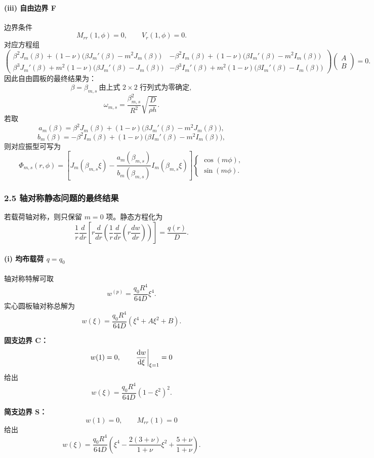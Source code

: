 \documentclass[12pt]{ctexart}
\begin{document}
\paragraph{(iii) 自由边界 F}
边界条件
\[
M_{rr}(1,\phi)=0,\qquad V_r(1,\phi)=0.
\]
对应方程组
\[
\begin{pmatrix}
\beta^2 J_m(\beta)+(1-\nu)\bigl(\beta J_m'(\beta)-m^2J_m(\beta)\bigr)
&
-\beta^2 I_m(\beta)+(1-\nu)\bigl(\beta I_m'(\beta)-m^2I_m(\beta)\bigr)
\\[6pt]
\beta^3 J_m'(\beta)+m^2(1-\nu)\bigl(\beta J_m'(\beta)-J_m(\beta)\bigr)
&
-\beta^3 I_m'(\beta)+m^2(1-\nu)\bigl(\beta I_m'(\beta)-I_m(\beta)\bigr)
\end{pmatrix}
\begin{pmatrix} A\\ B \end{pmatrix}=0.
\]
因此自由圆板的最终结果为：
\[
\beta=\beta_{m,s}\ \text{由上式 }2\times2\text{ 行列式为零确定},
\]
\[
\omega_{m,s}
=
\frac{\beta_{m,s}^2}{R^2}\sqrt{\frac{D}{\rho h}}.
\]
若取
\[
a_m(\beta)
=
\beta^2 J_m(\beta)+(1-\nu)\bigl(\beta J_m'(\beta)-m^2J_m(\beta)\bigr),
\]
\[
b_m(\beta)
=
-\beta^2 I_m(\beta)+(1-\nu)\bigl(\beta I_m'(\beta)-m^2I_m(\beta)\bigr),
\]
则对应振型可写为
\[
\Phi_{m,s}(r,\phi)
=
\left[
J_m(\beta_{m,s}\xi)-\frac{a_m(\beta_{m,s})}{b_m(\beta_{m,s})}I_m(\beta_{m,s}\xi)
\right]
\begin{cases}
\cos(m\phi),\\
\sin(m\phi).
\end{cases}
\]

\subsubsection*{2.5 轴对称静态问题的最终结果}
若载荷轴对称，则只保留 \(m=0\) 项。静态方程化为
\[
\frac{1}{r}\frac{d}{dr}\left[
r\frac{d}{dr}
\left(
\frac{1}{r}\frac{d}{dr}\left(r\frac{dw}{dr}\right)
\right)
\right]
=
\frac{q(r)}{D}.
\]

\paragraph{(i) 均布载荷 \(q=q_0\)}
轴对称特解可取
\[
w^{(p)}=\frac{q_0R^4}{64D}\xi^4.
\]
实心圆板轴对称总解为
\[
w(\xi)=\frac{q_0R^4}{64D}\left(\xi^4+A\xi^2+B\right).
\]

\textbf{固支边界 C：}
\[
w(1)=0,\qquad \left.\dv{w}{\xi}\right|_{\xi=1}=0
\]
给出
\[
w(\xi)=\frac{q_0R^4}{64D}(1-\xi^2)^2.
\]

\textbf{简支边界 S：}
\[
w(1)=0,\qquad M_{rr}(1)=0
\]
给出
\[
w(\xi)=\frac{q_0R^4}{64D}
\left(
\xi^4-\frac{2(3+\nu)}{1+\nu}\xi^2+\frac{5+\nu}{1+\nu}
\right).
\]
\end{document}
